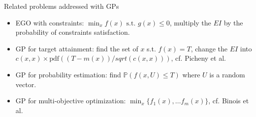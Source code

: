 \begin{frame}{}
\begin{exampleblock}{Related problems addressed with GPs}
\begin{itemize}
\item EGO with constraints: $\min_x f(x) \text{ s.t. } g(x) \le 0$, multiply the $EI$ by the probability of constraints satisfaction.
\item GP for target attainment: find the set of $x$ s.t. $f(x) = T$, change the $EI$ into $c(x,x) \times \text{pdf}\left((T-m(x))/sqrt(c(x,x))\right)$, cf. Picheny et al.
\item GP for probability estimation: find $\mathds P (f(x,U)\le T) $ where $U$ is a random vector.
\item GP for multi-objective optimization: $\min_x \{f_1(x), \dots f_m(x)\}$, cf. Binois et al.
\end{itemize}
\end{exampleblock}
\end{frame}



